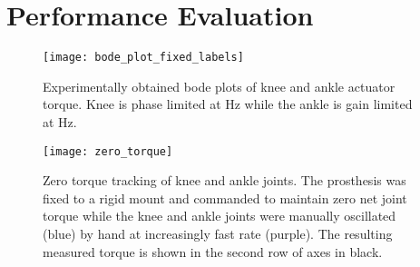 \section{Performance Evaluation}\label{sec:pros_perf_eval}

\begin{figure}[htb]
    \centering 
    \texttt{[image: bode\_plot\_fixed\_labels]}
    \caption{Experimentally obtained bode plots of knee and ankle actuator
    torque. Knee is phase limited at \unit[24]{Hz} while the ankle is gain
    limited at \unit[7]{Hz}.}\label{fig:pros_eval_bode_plots}
\end{figure}

\begin{figure}[htb]
    \centering 
    \texttt{[image: zero\_torque]}
    \caption{Zero torque tracking of knee and ankle joints. The prosthesis was
    fixed to a rigid mount and commanded to maintain zero net joint torque while
    the knee and ankle joints were manually oscillated (blue) by hand at
    increasingly fast rate (purple). The resulting measured torque is shown in
    the second row of axes in black.}\label{fig:pros_eval_zero_torque}
\end{figure}

